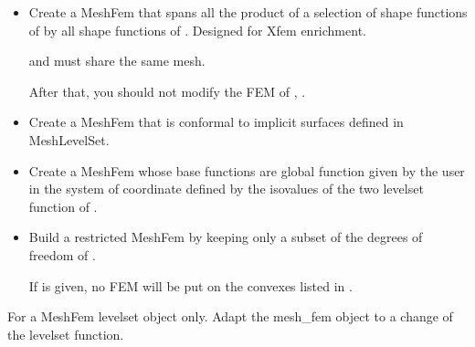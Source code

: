 \documentclass[a4paper,11pt,english]{sphinxmanual}
\begin{document}
\begin{fulllineitems}
\begin{itemize}
\item {} 
Create a MeshFem that spans all the product of a selection of shape
functions of  by all shape functions of .
Designed for Xfem enrichment.

 and  must share the same mesh.

After that, you should not modify the FEM of , .

\item {} 
Create a MeshFem that is conformal to implicit surfaces defined in
MeshLevelSet.

\item {} 
Create a MeshFem whose base functions are global function given by the
user in the system of coordinate defined by the iso\sphinxhyphen{}values of the two
level\sphinxhyphen{}set function of .

\item {} 
Build a restricted MeshFem by keeping only a subset of the degrees of
freedom of .

If  is given, no FEM will be put on the convexes listed in
.

\end{itemize}

\begin{fulllineitems}
\label{\detokenize{python/cmdref_MeshFem:getfem.MeshFem.adapt}}
For a MeshFem levelset object only. Adapt the mesh\_fem object to a
change of the levelset function.

\end{fulllineitems}



\end{fulllineitems}
\end{document}
